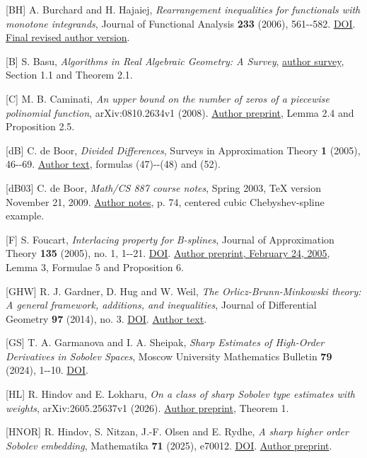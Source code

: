 \documentclass[11pt]{article}
\begin{document}
{[}BH{]} A. Burchard and H. Hajaiej, \emph{Rearrangement inequalities
for functionals with monotone integrands}, Journal of Functional
Analysis \textbf{233} (2006), 561-\/-582.
\href{https://doi.org/10.1016/j.jfa.2005.08.010}{DOI}.
\href{https://arxiv.org/abs/math/0506336}{Final revised author version}.

{[}B{]} S. Basu, \emph{Algorithms in Real Algebraic Geometry: A Survey},
\href{https://www.math.purdue.edu/~sbasu/raag_survey2011_final.pdf}{author
survey}, Section 1.1 and Theorem 2.1.

{[}C{]} M. B. Caminati, \emph{An upper bound on the number of zeros of a
piecewise polinomial function}, arXiv:0810.2634v1 (2008).
\href{https://arxiv.org/abs/0810.2634}{Author preprint}, Lemma 2.4 and
Proposition 2.5.

{[}dB{]} C. de Boor, \emph{Divided Differences}, Surveys in
Approximation Theory \textbf{1} (2005), 46-\/-69.
\href{https://arxiv.org/abs/math/0502036}{Author text}, formulas
(47)-\/-(48) and (52).

{[}dB03{]} C. de Boor, \emph{Math/CS 887 course notes}, Spring 2003, TeX
version November 21, 2009.
\href{https://pages.cs.wisc.edu/~deboor/887/notes.pdf}{Author notes}, p.
74, centered cubic Chebyshev-spline example.

{[}F{]} S. Foucart, \emph{Interlacing property for B-splines}, Journal
of Approximation Theory \textbf{135} (2005), no. 1, 1-\/-21.
\href{https://doi.org/10.1016/j.jat.2005.03.001}{DOI}.
\href{https://foucart.github.io/publi/tbsm2.pdf}{Author preprint,
February 24, 2005}, Lemma 3, Formulae 5 and Proposition 6.

{[}GHW{]} R. J. Gardner, D. Hug and W. Weil, \emph{The
Orlicz-Brunn-Minkowski theory: A general framework, additions, and
inequalities}, Journal of Differential Geometry \textbf{97} (2014), no.
3. \href{https://doi.org/10.4310/jdg/1406033976}{DOI}.
\href{https://arxiv.org/abs/1301.5267}{Author text}.

{[}GS{]} T. A. Garmanova and I. A. Sheipak, \emph{Sharp Estimates of
High-Order Derivatives in Sobolev Spaces}, Moscow University Mathematics
Bulletin \textbf{79} (2024), 1-\/-10.
\href{https://doi.org/10.3103/S0027132224700013}{DOI}.

{[}HL{]} R. Hindov and E. Lokharu, \emph{On a class of sharp Sobolev
type estimates with weights}, arXiv:2605.25637v1 (2026).
\href{https://arxiv.org/abs/2605.25637}{Author preprint}, Theorem 1.

{[}HNOR{]} R. Hindov, S. Nitzan, J.-F. Olsen and E. Rydhe, \emph{A sharp
higher order Sobolev embedding}, Mathematika \textbf{71} (2025), e70012.
\href{https://doi.org/10.1112/mtk.70012}{DOI}.
\href{https://arxiv.org/abs/2411.10201}{Author preprint}.
\end{document}
